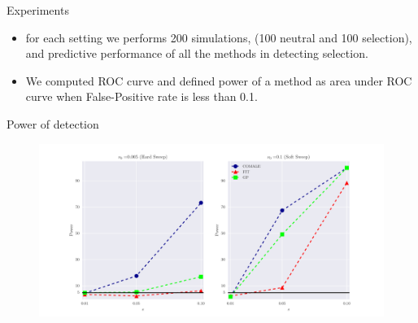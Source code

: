 \documentclass[t]{beamer} %
\begin{document}
%
%
%
%
%
%

\begin{frame}{Experiments}
\begin{itemize}
\item for each setting we performs 200 simulations, (100 neutral and 100 selection), and predictive performance of all the methods in detecting selection.
\item We computed ROC curve and defined power of a method as area under ROC curve when False-Positive rate is less than 0.1.
\end{itemize}
\end{frame}
\begin{frame}{Power of detection}
	\begin{figure}
		\centering \includegraphics[trim= 1in 0 1in 0 ,clip,		
		width=\textwidth]{power}
	\end{figure}
\end{frame}
\end{document}
